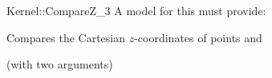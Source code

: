 \begin{ccRefFunctionObjectConcept}{Kernel::CompareZ_3}
A model for this must provide:


      {Compares the Cartesian $z$-coordinates of points  and
      }

\ccRefines
{} (with two arguments)

\ccSeeAlso
{} \\

\end{ccRefFunctionObjectConcept}
